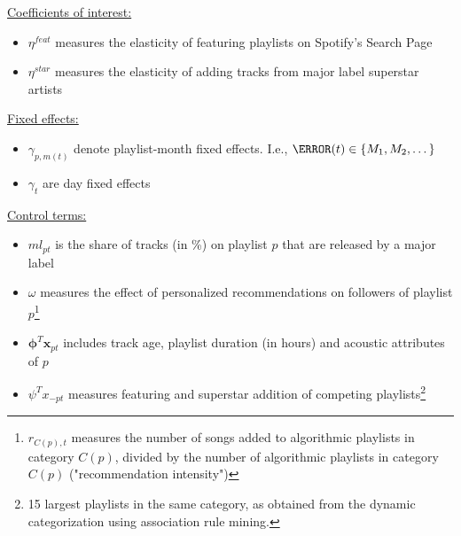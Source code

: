 \documentclass[8pt]{beamer}
\begin{document}
\begin{frame}[label=shortversion]
\underline{Coefficients of interest:}
\begin{itemize}
\item $\eta^{feat}$ measures the elasticity of featuring playlists on Spotify's Search Page
\item $\eta^{star}$ measures the elasticity of adding tracks from major label superstar artists
\end{itemize}
\underline{Fixed effects:}
\begin{itemize}
\item $\gamma_{p,m(t)}$ denote playlist-month fixed effects. I.e., $\m(t) \in \{M_1, M_2, \dots \}$ 
\item $\gamma_t$ are day fixed effects
\end{itemize}
\underline{Control terms:}
\begin{itemize}
\item $ml_{pt}$ is the share of tracks (in \%) on playlist $p$ that are released by a major label
\item $\omega$ measures the effect of personalized recommendations on followers of playlist $p$\footnote{$r_{C(p),t}$ measures the number of songs added to algorithmic playlists in category $C(p)$, divided by the number of algorithmic playlists in category $C(p)$ ("recommendation intensity")}
\item $\boldsymbol{\phi}^{T} \boldsymbol{x}_{pt}$ includes track age, playlist duration (in hours) and acoustic attributes of $p$
\item $\psi^{T} x_{-pt}$ measures featuring and superstar addition of competing playlists\footnote{15 largest playlists in the same category, as obtained from the dynamic categorization using association rule mining.}
\end{itemize}
\end{frame}

\end{document}
